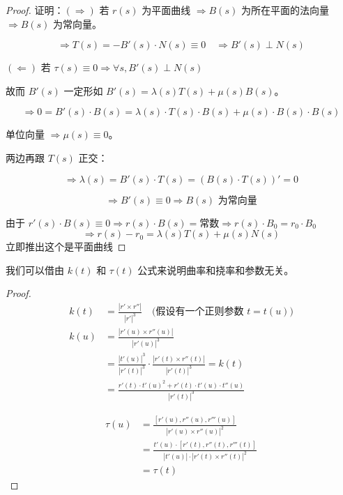 \documentclass[lang=cn,10pt,thmcnt=section]{elegantbook}
\begin{document}
    \begin{proof}
    证明：$(\Rightarrow)$ 若 $r(s)$ 为平面曲线 $\Rightarrow B(s)$ 为所在平面的法向量 $\Rightarrow B(s)$ 为常向量。
    
    \[
    \Rightarrow T(s) = -B'(s) \cdot N(s) \equiv 0 \quad \Rightarrow B'(s) \perp N(s)
    \]
    
    $(\Leftarrow)$ 若 $\tau(s) \equiv 0 \Rightarrow \forall s, B'(s) \perp N(s)$
    
    故而 $B'(s)$ 一定形如 $B'(s) = \lambda(s) T(s) + \mu(s) B(s)$。
    
    \[
    \Rightarrow 0 = B'(s) \cdot B(s) = \lambda(s) \cdot T(s) \cdot B(s) + \mu(s) \cdot B(s) \cdot B(s)
    \]
    
    单位向量 $\Rightarrow \mu(s) \equiv 0$。
    
    两边再跟 $T(s)$ 正交：
    
    \[
    \Rightarrow \lambda(s) = B'(s) \cdot T(s) = (B(s) \cdot T(s))' = 0
    \]
    
    \[
    \Rightarrow B'(s) \equiv 0 \Rightarrow B(s) \text{ 为常向量}
    \]
    
    由于 $r'(s) \cdot B(s) \equiv 0 \Rightarrow r(s) \cdot B(s) = \text{常数} \Rightarrow r(s) \cdot B_0 = r_0 \cdot B_0$
    \[
    \Rightarrow r(s) - r_0 = \lambda(s) T(s) + \mu(s) N(s)
    \]
    立即推出这个是平面曲线
\end{proof} 
我们可以借由 $k(t)$ 和 $\tau(t)$ 公式来说明曲率和挠率和参数无关。

\begin{proof}
    \begin{align*}
        k(t) &= \frac{|r' \times r''|}{|r'|^3} \quad \text{(假设有一个正则参数 } t = t(u) \text{)} \\
        k(u) &= \frac{|r'(u) \times r''(u)|}{|r'(u)|^3} \\
        &= \frac{|t'(u)|^3}{|r'(t)|^3} \cdot \frac{|r'(t) \times r''(t)|}{|r'(t)|^3} = k(t) \\
        &= \frac{r'(t) \cdot t'(u)^2 + r'(t) \cdot t'(u) \cdot t''(u)}{|r'(t)|^3}
        \end{align*}
        
        \begin{align*}
        \tau(u) &= \frac{[r'(u), r''(u), r'''(u)]}{|r'(u) \times r''(u)|^2} \\
        &= \frac{t'(u) \cdot [r'(t), r''(t), r'''(t)]}{|t'(u)| \cdot |r'(t) \times r''(t)|^2} \\
        &= \tau(t)
        \end{align*}
\end{proof}
\end{document}
